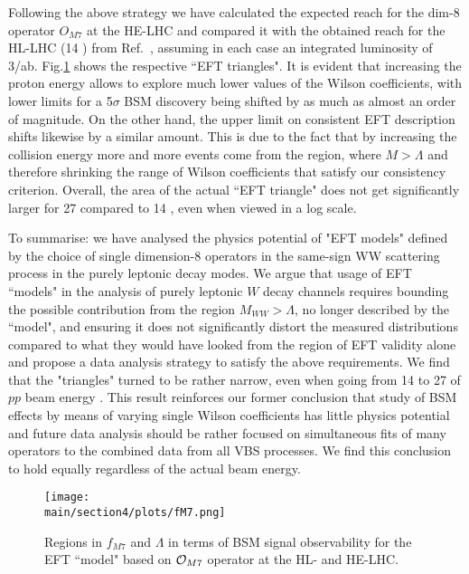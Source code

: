 Following the above strategy we have calculated the expected reach for the dim-8 operator $O_{M7}$ at the HE-LHC and compared it with the obtained reach for the HL-LHC (14 \UTeV) from Ref.~\cite{Kalinowski:2018oxd}, assuming in each case an integrated luminosity of 3/ab.  Fig.\ref{fig:fM7} shows the respective ``EFT triangles".  It is evident that increasing the proton energy allows to explore much lower values of the Wilson coefficients, with lower limits for a 5$\sigma$ BSM discovery being shifted by as much as almost an order of magnitude.  On the other hand, the upper limit on consistent EFT description shifts likewise by a similar amount. This is due to the fact that by increasing the collision energy more and more events come from the region, where $M>\Lambda$ and therefore shrinking the range of Wilson coefficients that satisfy our consistency criterion.  Overall, the area of the actual ``EFT triangle" does not get significantly larger for 27 \UTeV compared to 14 \UTeV, even when viewed in a log scale.  

To summarise:  we have analysed the physics potential of "EFT models" defined by the choice of single dimension-8 operators in the same-sign WW scattering process in the purely leptonic decay modes.  
We argue that usage of EFT ``models" in the analysis of purely
leptonic $W$ decay channels requires bounding the possible contribution from
the region $M_{WW} > \Lambda$, no longer described by the ``model",
and ensuring it does not significantly distort the measured distributions 
compared to what they would have looked from the region of EFT validity alone and 
propose a data analysis strategy to satisfy the above requirements.  
We find that the "triangles"  turned to be rather narrow, even when going from 14 to 27 \UTeV of $pp$ beam energy . This result reinforces our former conclusion that study of BSM effects by means of varying single Wilson coefficients has little physics potential and future data analysis should be rather focused on simultaneous fits of many operators to the combined data from all VBS processes.  We find this conclusion to hold equally regardless of the actual beam energy.




\begin{figure}
\centering
\texttt{[image: \\main/section4/plots/fM7.png]}
\caption{
Regions in $f_{M7}$ and $\Lambda$ in terms of BSM signal observability
for the EFT ``model"  based on ${\cal O}_{M7}$ operator at the HL- and HE-LHC.}
\label{fig:fM7}
\end{figure}




%
